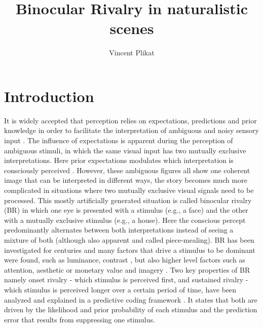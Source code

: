 \documentclass[]{article}
\title{Binocular Rivalry in naturalistic scenes}
\author{Vincent Plikat}
\begin{document}
\maketitle

\begin{abstract}

\end{abstract}

\section*{Introduction}
It is widely accepted that perception relies on expectations, predictions and prior knowledge in order to facilitate the interpretation of ambiguous and noisy sensory input \parencite{clarkWhateverNextPredictive2013}. 
The influence of expectations is apparent during the perception of ambiguous stimuli, in which the same visual input has two mutually exclusive interpretations. Here prior expectations modulates which interpretation is consciously perceived \parencite{panichelloPredictiveFeedbackConscious2012}. 
However, these ambiguous figures all show one coherent image that can be interpreted in different ways, the story becomes much more complicated in situations where two mutually exclusive visual signals need to be processed. This mostly artificially generated situation is called binocular rivalry (BR) in which one eye is presented with a stimulus (e.g., a face) and the other with a mutually exclusive stimulus (e.g., a house). Here the conscious percept predominantly alternates between both interpretations instead of seeing a mixture of both (although also apparent and called piece-mealing). BR has been investigated for centuries and many factors that drive a stimulus to be dominant were found, such as luminance, contrast \parencite{brascampLawsBinocularRivalry2015}, but also higher level factors such as attention, aesthetic or monetary value and imagery \parencite{safaviMultistabilityPerceptualValue2022}. 
Two key properties of BR namely onset rivalry - which stimulus is perceived first, and sustained rivalry - which stimulus is perceived longer over a certain period of time, have been analyzed and explained in a predictive coding framework \parencite{hohwyPredictiveCodingExplains2008}. It states that both are driven by the likelihood and prior probability of each stimulus and the prediction error that results from suppressing one stimulus.
\end{document}
